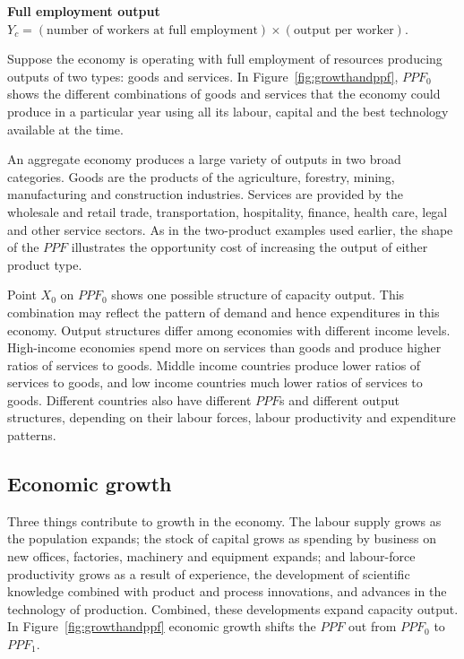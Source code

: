 \begin{DefBox}
\textbf{Full employment output} $Y_c=(\text{number of workers at full employment})\times(\text{output per worker})$.
\end{DefBox}

Suppose the economy is operating with full employment of resources producing outputs of two types: goods and services. In Figure~\ref{fig:growthandppf}, $PPF_0$ shows the different combinations of goods and services that the economy could produce in a particular year using all its labour, capital and the best technology available at the time. 

An aggregate economy produces a large variety of outputs in two broad categories. Goods are the products of the agriculture, forestry, mining, manufacturing and construction industries.  Services are provided by the wholesale and retail trade, transportation, hospitality, finance, health care, legal and other service sectors.  As in the two-product examples used earlier, the shape of the $PPF$ illustrates the opportunity cost of increasing the output of either product type.

Point $X_0$ on $PPF_0$ shows one possible structure of capacity output. This combination may reflect the pattern of demand and hence expenditures in this economy.  Output structures differ among economies with different income levels. High-income economies spend more on services than goods and produce higher ratios of services to goods. Middle income countries produce lower ratios of services to goods, and low income countries much lower ratios of services to goods.  Different countries also have different $PPF$s and different output structures, depending on their labour forces, labour productivity and expenditure patterns.

\subsection*{Economic growth}

Three things contribute to growth in the economy. The labour supply grows as the population expands; the stock of capital grows as spending by business on new offices, factories, machinery and equipment expands; and labour-force productivity grows as a result of experience, the development of scientific knowledge combined with product and process innovations, and advances in the technology of production.  Combined, these developments expand capacity output. In Figure~\ref{fig:growthandppf} economic growth shifts the $PPF$ out from $PPF_0$ to $PPF_1$.

